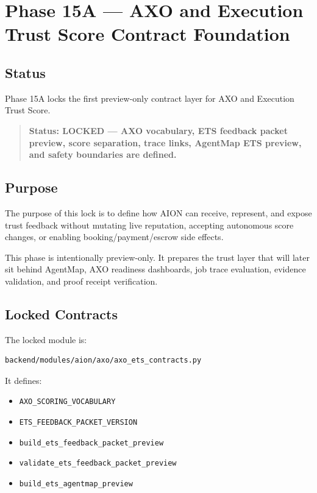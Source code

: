 \section{Phase 15A --- AXO and Execution Trust Score Contract Foundation}
\label{sec:aion-phase15a-axo-ets-contract-foundation-lock}

\subsection{Status}

Phase 15A locks the first preview-only contract layer for AXO and Execution Trust Score.

\begin{quote}
\textbf{Status: LOCKED --- AXO vocabulary, ETS feedback packet preview, score separation, trace links, AgentMap ETS preview, and safety boundaries are defined.}
\end{quote}

\subsection{Purpose}

The purpose of this lock is to define how AION can receive, represent, and expose trust feedback without mutating live reputation, accepting autonomous score changes, or enabling booking/payment/escrow side effects.

This phase is intentionally preview-only. It prepares the trust layer that will later sit behind AgentMap, AXO readiness dashboards, job trace evaluation, evidence validation, and proof receipt verification.

\subsection{Locked Contracts}

The locked module is:

\begin{verbatim}
backend/modules/aion/axo/axo_ets_contracts.py
\end{verbatim}

It defines:

\begin{itemize}
  \item \texttt{AXO\_SCORING\_VOCABULARY}
  \item \texttt{ETS\_FEEDBACK\_PACKET\_VERSION}
  \item \texttt{build\_ets\_feedback\_packet\_preview}
  \item \texttt{validate\_ets\_feedback\_packet\_preview}
  \item \texttt{build\_ets\_agentmap\_preview}
\end{itemize}

